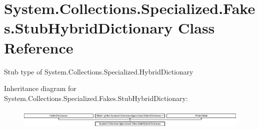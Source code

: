 \hypertarget{class_system_1_1_collections_1_1_specialized_1_1_fakes_1_1_stub_hybrid_dictionary}{\section{System.\-Collections.\-Specialized.\-Fakes.\-Stub\-Hybrid\-Dictionary Class Reference}
\label{class_system_1_1_collections_1_1_specialized_1_1_fakes_1_1_stub_hybrid_dictionary}
}


Stub type of System.\-Collections.\-Specialized.\-Hybrid\-Dictionary 


Inheritance diagram for System.\-Collections.\-Specialized.\-Fakes.\-Stub\-Hybrid\-Dictionary\-:\begin{figure}[H]
\begin{center}
\leavevmode
\includegraphics[height=0.969697cm]{class_system_1_1_collections_1_1_specialized_1_1_fakes_1_1_stub_hybrid_dictionary}
\end{center}
\end{figure}

